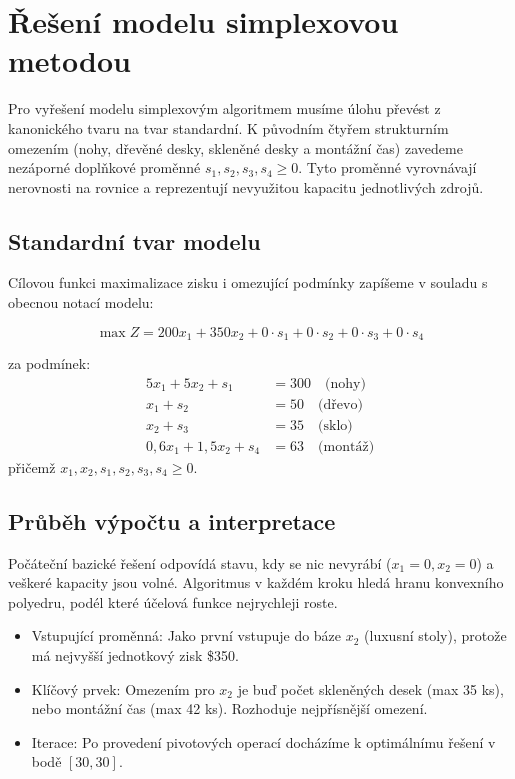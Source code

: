 \documentclass[../sablona-main.tex]{subfiles}
\begin{document}
\section{Řešení modelu simplexovou metodou}
Pro vyřešení modelu simplexovým algoritmem musíme úlohu převést z kanonického tvaru na tvar standardní. K původním čtyřem strukturním omezením (nohy, dřevěné desky, skleněné desky a montážní čas) zavedeme nezáporné doplňkové proměnné $s_1, s_2, s_3, s_4 \ge 0$. Tyto proměnné vyrovnávají nerovnosti na rovnice a reprezentují nevyužitou kapacitu jednotlivých zdrojů.

\subsection{Standardní tvar modelu}
Cílovou funkci maximalizace zisku i omezující podmínky zapíšeme v souladu s obecnou notací modelu:

\begin{equation}
	\max Z = 200x_1 + 350x_2 + 0 \cdot s_1 + 0 \cdot s_2 + 0 \cdot s_3 + 0 \cdot s_4
\end{equation}

za podmínek:
\begin{align}
	5x_1 + 5x_2 + s_1 &= 300 \quad \text{(nohy)} \\
	x_1 + s_2 &= 50 \quad \text{(dřevo)} \\
	x_2 + s_3 &= 35 \quad \text{(sklo)} \\
	0{,}6x_1 + 1{,}5x_2 + s_4 &= 63 \quad \text{(montáž)}
\end{align}
přičemž $x_1, x_2, s_1, s_2, s_3, s_4 \ge 0$.

\subsection{Průběh výpočtu a interpretace}
Počáteční bazické řešení odpovídá stavu, kdy se nic nevyrábí ($x_1=0, x_2=0$) a veškeré kapacity jsou volné. Algoritmus v každém kroku hledá hranu konvexního polyedru, podél které účelová funkce nejrychleji roste.

\begin{itemize}
	\item Vstupující proměnná: Jako první vstupuje do báze $x_2$ (luxusní stoly), protože má nejvyšší jednotkový zisk \$350.
	\item Klíčový prvek: Omezením pro $x_2$ je buď počet skleněných desek (max 35 ks), nebo montážní čas (max 42 ks). Rozhoduje nejpřísnější omezení.
	\item Iterace: Po provedení pivotových operací docházíme k optimálnímu řešení v bodě $[30, 30]$.
\end{itemize}
\end{document}
